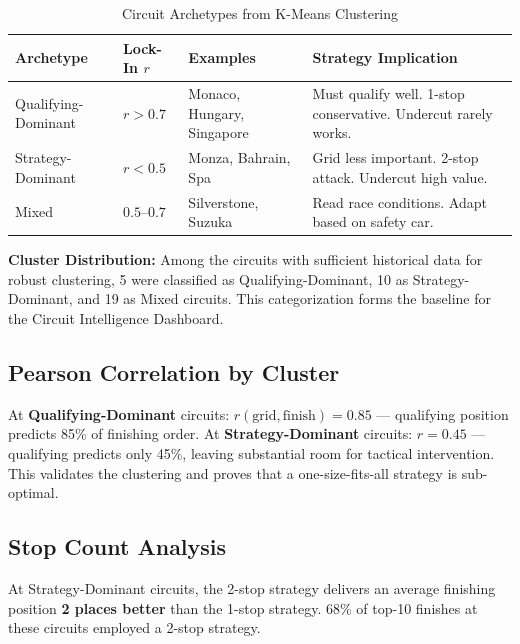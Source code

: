 \documentclass[12pt, a4paper]{article}
\begin{document}
\begin{table}[H]
\centering
\caption{Circuit Archetypes from K-Means Clustering}
\begin{tabularx}{\textwidth}{l l l X}
\toprule
\textbf{Archetype} & \textbf{Lock-In $r$} & \textbf{Examples} & \textbf{Strategy Implication} \\
\midrule
Qualifying-Dominant & $r > 0.7$ & Monaco, Hungary, Singapore & Must qualify well. 1-stop conservative. Undercut rarely works. \\
Strategy-Dominant   & $r < 0.5$ & Monza, Bahrain, Spa & Grid less important. 2-stop attack. Undercut high value. \\
Mixed               & $0.5$--$0.7$ & Silverstone, Suzuka & Read race conditions. Adapt based on safety car. \\
\bottomrule
\end{tabularx}
\end{table}

\textbf{Cluster Distribution:} Among the circuits with sufficient historical data for robust clustering, 5 were classified as Qualifying-Dominant, 10 as Strategy-Dominant, and 19 as Mixed circuits. This categorization forms the baseline for the Circuit Intelligence Dashboard.

\subsection{Pearson Correlation by Cluster}
At \textbf{Qualifying-Dominant} circuits: $r(\text{grid}, \text{finish}) = 0.85$ --- qualifying position predicts 85\% of finishing order. At \textbf{Strategy-Dominant} circuits: $r = 0.45$ --- qualifying predicts only 45\%, leaving substantial room for tactical intervention. This validates the clustering and proves that a one-size-fits-all strategy is sub-optimal.

\subsection{Stop Count Analysis}
At Strategy-Dominant circuits, the 2-stop strategy delivers an average finishing position \textbf{2 places better} than the 1-stop strategy. 68\% of top-10 finishes at these circuits employed a 2-stop strategy.
\end{document}
